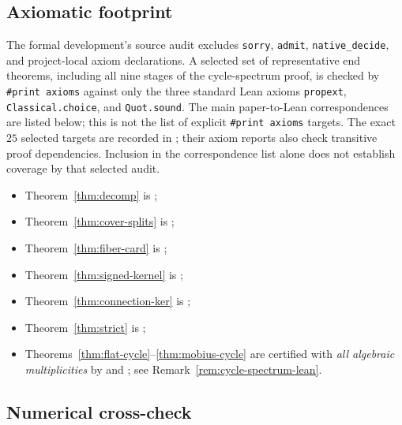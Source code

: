 \documentclass[11pt,a4paper]{amsart}
\theoremstyle{plain}
\theoremstyle{definition}
\theoremstyle{remark}
\begin{document}
\subsection*{Axiomatic footprint}

The formal development's source audit excludes \texttt{sorry},
\texttt{admit}, \texttt{native\_decide}, and project-local axiom
declarations. A selected set of representative end theorems,
including all nine stages of the cycle-spectrum proof, is checked
by \texttt{\#print axioms} against only the three standard Lean
axioms \texttt{propext}, \texttt{Classical.choice}, and
\texttt{Quot.sound}. The main paper-to-Lean correspondences are listed
below; this is not the list of explicit \texttt{\#print axioms} targets.
The exact $25$ selected targets are recorded in
; their axiom reports also
check transitive proof dependencies. Inclusion in the correspondence
list alone does not establish coverage by that selected audit.
\begin{itemize}
  \item Theorem~\ref{thm:decomp} is
    ;
  \item Theorem~\ref{thm:cover-splits} is
    ;
  \item Theorem~\ref{thm:fiber-card} is
    ;
  \item Theorem~\ref{thm:signed-kernel} is
    ;
  \item Theorem~\ref{thm:connection-ker} is
    ;
  \item Theorem~\ref{thm:strict} is
    ;
  \item Theorems~\ref{thm:flat-cycle}--\ref{thm:mobius-cycle} are
    certified with \emph{all algebraic multiplicities} by
     and
    ; see
    Remark~\ref{rem:cycle-spectrum-lean}.
\end{itemize}

\subsection*{Numerical cross-check}
\end{document}
